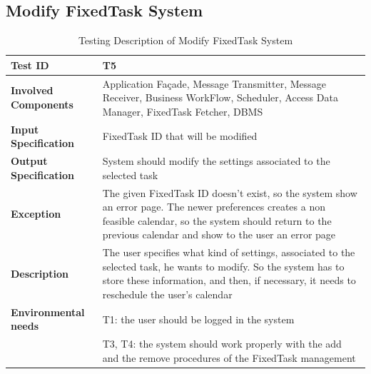 \subsection*{Modify FixedTask System}

\begin{table}[H]
    \centering
    \begin{tabular}{p{4.55cm} p{7cm}}
        
        \hline
        
        \textbf{Test ID}                & T5 \\
        
        \hline
        
        \textbf{Involved Components}    & Application Façade, Message Transmitter, Message Receiver, Business                                          WorkFlow, Scheduler, Access Data Manager, FixedTask Fetcher, DBMS\\
        
        \hline
        
        \textbf{Input Specification}    & FixedTask ID that will be modified\\
        
        \hline
        
        \textbf{Output Specification}   & System should modify the settings associated to the selected task\\
        
        \hline
        
        \textbf{Exception}              & The given FixedTask ID doesn't exist, so the system show an error page. The newer preferences creates a non feasible calendar, so the system should return to the previous calendar and show to the user an error page\\
        
        \hline
        
        \textbf{Description}            & The user specifies what kind of settings, associated to the selected task, he wants to modify. So the system has to store these information, and then, if necessary, it needs to reschedule the user's calendar\\
        \hline
        
        \textbf{Environmental needs}    & T1: the user should be logged in the system\\
                                        & T3, T4: the system should work properly with the add and the remove procedures of the FixedTask management \\
        
        \hline
        
    \end{tabular}
    \caption{Testing Description of Modify FixedTask System}
    
\end{table}




